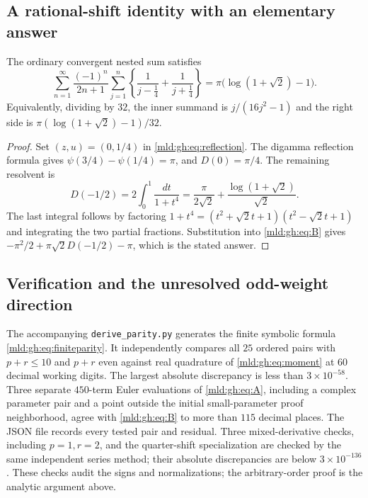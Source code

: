 \subsection{A rational-shift identity with an elementary answer}

\begin{corollary}\label{mld:gh:cor:quartershift}
The ordinary convergent nested sum satisfies
\begin{equation}\label{mld:gh:eq:quartershift}
 \boxed{
 \sum_{n=1}^{\infty}\frac{(-1)^n}{2n+1}
  \sum_{j=1}^n\left\{\frac1{j-\frac14}+\frac1{j+\frac14}\right\}
 =\pi\bigl(\log(1+\sqrt2)-1\bigr).}
\end{equation}
Equivalently, dividing by $32$, the inner summand is
$j/(16j^2-1)$ and the right side is
$\pi(\log(1+\sqrt2)-1)/32$.
\end{corollary}
\begin{proof}
Set $(z,u)=(0,1/4)$ in \eqref{mld:gh:eq:reflection}.
The digamma reflection formula gives
$\psi(3/4)-\psi(1/4)=\pi$, and $D(0)=\pi/4$.
The remaining resolvent is
\[
 D(-1/2)=2\int_0^1\frac{dt}{1+t^4}
 =\frac{\pi}{2\sqrt2}
       +\frac{\log(1+\sqrt2)}{\sqrt2}.
\]
The last integral follows by factoring
$1+t^4=(t^2+\sqrt2t+1)(t^2-\sqrt2t+1)$ and integrating the two
partial fractions. Substitution into \eqref{mld:gh:eq:B} gives
$-\pi^2/2+\pi\sqrt2D(-1/2)-\pi$, which is the stated answer.
\end{proof}

\subsection{Verification and the unresolved odd-weight direction}

The accompanying \texttt{derive\_parity.py} generates the finite symbolic
formula \eqref{mld:gh:eq:finiteparity}. It independently compares all $25$
ordered pairs with $p+r\leq10$ and $p+r$ even against real quadrature
of \eqref{mld:gh:eq:moment} at $60$ decimal working digits. The largest
absolute discrepancy is less than $3\times10^{-58}$.
Three separate $450$-term Euler evaluations of \eqref{mld:gh:eq:A}, including
a complex parameter pair and a point outside the initial small-parameter
proof neighborhood, agree with \eqref{mld:gh:eq:B} to more than $115$
decimal places. The JSON file records every tested pair and residual.
Three mixed-derivative checks, including $p=1,r=2$, and the quarter-shift
specialization are checked by the same independent series method; their
absolute discrepancies are below $3\times10^{-136}$.
These checks audit the signs and normalizations; the arbitrary-order
proof is the analytic argument above.

